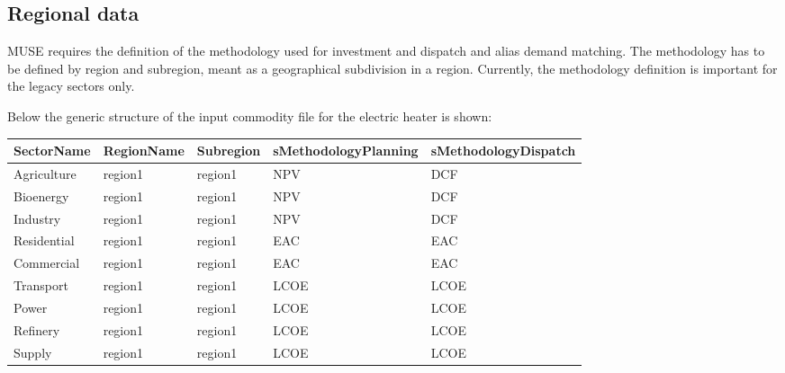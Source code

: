 \documentclass[letterpaper,10pt,english]{sphinxmanual}
\begin{document}
\subsection{Regional data}
\label{\detokenize{inputs/regions:regional-data}}\label{\detokenize{inputs/regions:id1}}\label{\detokenize{inputs/regions::doc}}
MUSE requires the definition of the methodology used for investment and dispatch and alias
demand matching. The methodology has to be defined by region and subregion, meant as a
geographical subdivision in a region. Currently, the methodology definition is
important for the legacy sectors only.

Below the generic structure of the input commodity file for the electric
heater is shown:


\begin{savenotes}\sphinxattablestart
\centering
{}
\sphinxthecaptionisattop
{}\label{\detokenize{inputs/regions:id2}}
\sphinxaftertopcaption
\begin{tabulary}{\linewidth}[t]{|T|T|T|T|T|}
\hline
\sphinxstyletheadfamily 
SectorName
&\sphinxstyletheadfamily 
RegionName
&\sphinxstyletheadfamily 
Subregion
&\sphinxstyletheadfamily 
sMethodologyPlanning
&\sphinxstyletheadfamily 
sMethodologyDispatch
\\
\hline
Agriculture
&
region1
&
region1
&
NPV
&
DCF
\\
\hline
Bioenergy
&
region1
&
region1
&
NPV
&
DCF
\\
\hline
Industry
&
region1
&
region1
&
NPV
&
DCF
\\
\hline
Residential
&
region1
&
region1
&
EAC
&
EAC
\\
\hline
Commercial
&
region1
&
region1
&
EAC
&
EAC
\\
\hline
Transport
&
region1
&
region1
&
LCOE
&
LCOE
\\
\hline
Power
&
region1
&
region1
&
LCOE
&
LCOE
\\
\hline
Refinery
&
region1
&
region1
&
LCOE
&
LCOE
\\
\hline
Supply
&
region1
&
region1
&
LCOE
&
LCOE
\\
\hline
\end{tabulary}
\par
\sphinxattableend\end{savenotes}
\end{document}

